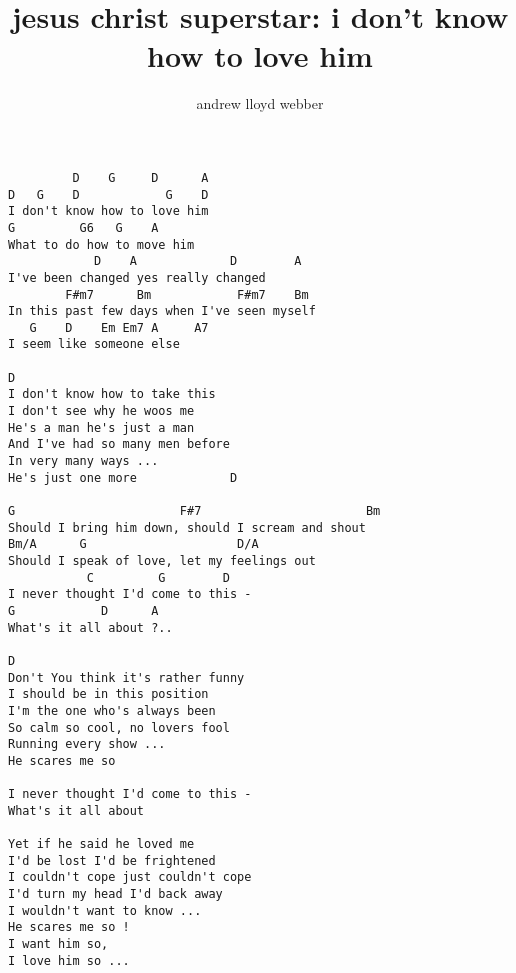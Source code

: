 \author{andrew lloyd webber}
\title{jesus christ superstar: i don't know how to love him}
\maketitle
\begin{verbatim}   
         D    G     D      A
D   G    D            G    D
I don't know how to love him
G         G6   G    A
What to do how to move him
            D    A             D        A
I've been changed yes really changed
        F#m7      Bm            F#m7    Bm
In this past few days when I've seen myself
   G    D    Em Em7 A     A7
I seem like someone else

D
I don't know how to take this
I don't see why he woos me
He's a man he's just a man
And I've had so many men before
In very many ways ...
He's just one more             D

G                       F#7                       Bm
Should I bring him down, should I scream and shout
Bm/A      G                     D/A
Should I speak of love, let my feelings out
           C         G        D
I never thought I'd come to this -
G            D      A
What's it all about ?..

D
Don't You think it's rather funny
I should be in this position
I'm the one who's always been
So calm so cool, no lovers fool
Running every show ...
He scares me so

I never thought I'd come to this -
What's it all about

Yet if he said he loved me
I'd be lost I'd be frightened
I couldn't cope just couldn't cope
I'd turn my head I'd back away
I wouldn't want to know ...
He scares me so !
I want him so,
I love him so ...
\end{verbatim}